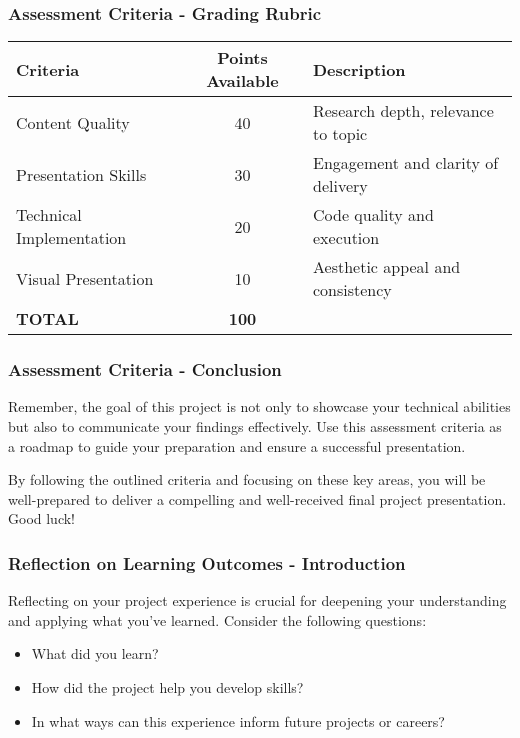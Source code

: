 \documentclass[aspectratio=169]{beamer}
\begin{document}
\begin{frame}[fragile]
  \frametitle{Assessment Criteria - Grading Rubric}
  \begin{tabular}{|l|c|l|}
    \hline
    \textbf{Criteria} & \textbf{Points Available} & \textbf{Description} \\
    \hline
    Content Quality & 40 & Research depth, relevance to topic \\
    \hline
    Presentation Skills & 30 & Engagement and clarity of delivery \\
    \hline
    Technical Implementation & 20 & Code quality and execution \\
    \hline
    Visual Presentation & 10 & Aesthetic appeal and consistency \\
    \hline
    \textbf{TOTAL} & \textbf{100} &  \\
    \hline
  \end{tabular}
\end{frame}

\begin{frame}
  \frametitle{Assessment Criteria - Conclusion}
  Remember, the goal of this project is not only to showcase your technical abilities but also to communicate your findings effectively. 
  Use this assessment criteria as a roadmap to guide your preparation and ensure a successful presentation.
  
  By following the outlined criteria and focusing on these key areas, you will be well-prepared to deliver a compelling and well-received final project presentation. Good luck!
\end{frame}

\begin{frame}[fragile]
  \frametitle{Reflection on Learning Outcomes - Introduction}
  Reflecting on your project experience is crucial for deepening your understanding and applying what you've learned. Consider the following questions:
  
  \begin{itemize}
    \item What did you learn?
    \item How did the project help you develop skills?
    \item In what ways can this experience inform future projects or careers?
  \end{itemize}
\end{frame}
\end{document}
